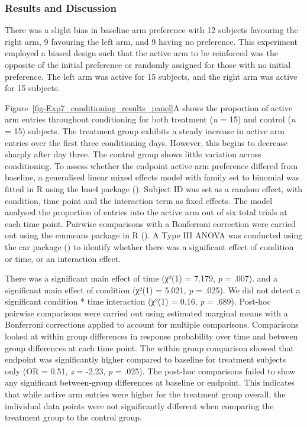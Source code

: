 \documentclass[
  jou,
  floatsintext,
  longtable,
  nolmodern,
  notxfonts,
  notimes,
  donotrepeattitle,
  colorlinks=true,linkcolor=blue,citecolor=blue,urlcolor=blue]{apa7}
\begin{document}
\subsubsection{Results and Discussion}\label{results-and-discussion-2}

There was a slight bias in baseline arm preference with 12 subjects
favouring the right arm, 9 favouring the left arm, and 9 having no
preference. This experiment employed a biased design such that the
active arm to be reinforced was the opposite of the initial preference
or randomly assigned for those with no initial preference. The left arm
was active for 15 subjects, and the right arm was active for 15
subjects.

Figure~\ref{fig-Exp7_conditioning_results_panel}A shows the proportion
of active arm entries throughout conditioning for both treatment
(\emph{n} = 15) and control (\emph{n} = 15) subjects. The treatment
group exhibits a steady increase in active arm entries over the first
three conditioning days. However, this begins to decrease sharply after
day three. The control group shows little variation across conditioning.
To assess whether the endpoint active arm preference differed from
baseline, a generalised linear mixed effects model with family set to
binomial was fitted in R using the lme4 package
(). Subject ID was
set as a random effect, with condition, time point and the interaction
term as fixed effects. The model analysed the proportion of entries into
the active arm out of six total trials at each time point. Pairwise
comparisons with a Bonferroni correction were carried out using the
emmeans package in R (). A
Type III ANOVA was conducted using the car package
() to identify whether
there was a significant effect of condition or time, or an interaction
effect.

There was a significant main effect of time (χ²(1) = 7.179, \emph{p} =
.007). and a significant main effect of condition (χ²(1) = 5.021,
\emph{p} = .025). We did not detect a significant condition * time
interaction (χ²(1) = 0.16, \emph{p} = .689). Post-hoc pairwise
comparisons were carried out using estimated marginal means with a
Bonferroni corrections applied to account for multiple comparisons.
Comparisons looked at within group differences in response probability
over time and between group differences at each time point. The within
group comparison showed that endpoint was significantly higher compared
to baseline for treatment subjects only (OR = 0.51, \emph{z} = -2.23,
\emph{p} = .025). The post-hoc comparisons failed to show any
significant between-group differences at baseline or endpoint. This
indicates that while active arm entries were higher for the treatment
group overall, the individual data points were not significantly
different when comparing the treatment group to the control group.
\end{document}

